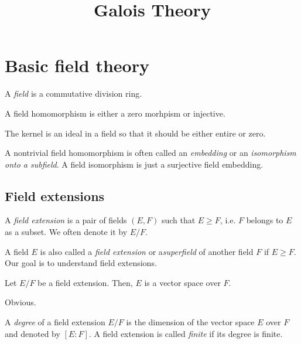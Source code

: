 \documentclass{../exp}
\title{Galois Theory}
\begin{document}
\maketitle
\tableofcontents







\section{Basic field theory}

\begin{defn}
A \emph{field} is a commutative division ring.
\end{defn}

\begin{prop}
A field homomorphism is either a zero morhpism or injective.
\end{prop}
\begin{pf}
The kernel is an ideal in a field so that it should be either entire or zero.
\end{pf}

A nontrivial field homomorphism is often called an \emph{embedding} or an \emph{isomorphism onto a subfield}.
A field isomorphism is just a surjective field embedding.




\subsection{Field extensions}
\begin{defn}
A \emph{field extension} is a pair of fields $(E,F)$ such that $E\ge F$, i.e. $F$ belongs to $E$ as a subset.
We often denote it by $E/F$.
\end{defn}
A field $E$ is also called a \emph{field extension} or a\emph{superfield} of another field $F$ if $E\ge F$.
Our goal is to understand field extensions.

\begin{prop}
Let $E/F$ be a field extension.
Then, $E$ is a vector space over $F$.
\end{prop}
\begin{pf}
Obvious.
\end{pf}

\begin{defn}
A \emph{degree} of a field extension $E/F$ is the dimension of the vector space $E$ over $F$ and denoted by $[E:F]$.
A field extension is called \emph{finite} if its degree is finite.
\end{defn}
\end{document}
